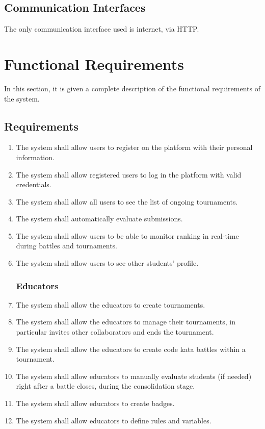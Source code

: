 \subsection{Communication Interfaces}
The only communication interface used is internet, via HTTP.
\clearpage

\section{Functional Requirements}
In this section, it is given a complete description of the functional requirements of the system.

    \subsection{Requirements}
        \begin{enumerate}[label=\textbf{R.\arabic*}]
            \subsubsection*{Users}
            \item {} {The system shall allow users to register on the platform with their personal information.}
            \item {} {The system shall allow registered users to log in the platform with valid credentials.}
            \item {} {The system shall allow all users to see the list of ongoing tournaments.}
            \item {} {The system shall automatically evaluate submissions.}
            \item {} {The system shall allow users to be able to monitor ranking in real-time during battles and tournaments.}
            \item {} {The system shall allow users to see other students' profile.}
            
            \subsubsection*{Educators}
            \item {} {The system shall allow the educators to create tournaments.}
            \item {} {The system shall allow the educators to manage their tournaments, in particular invites other collaborators and ends the tournament.}
            \item {} {The system shall allow the educators to create code kata battles within a tournament.}
             \item {} {The system shall allow educators to manually evaluate students (if needed) right after a battle closes, during the consolidation stage.}
            \item {} {The system shall allow educators to create badges.}
            \item {} {The system shall allow educators to define rules and variables.}


\end{enumerate}
